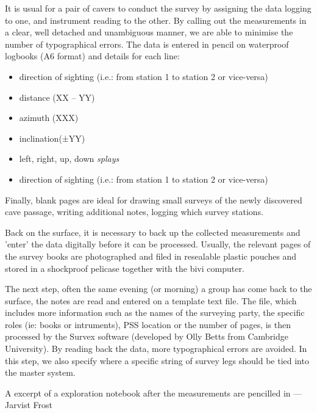 It is usual for a pair of cavers to conduct the survey by assigning the data logging to one, and instrument reading to the other. By calling out the measurements in a clear, well detached and unambiguous manner, we are able to minimise the number of typographical errors. The data is entered in pencil on waterproof logbooks (A6 format) and details for each line:

\begin{itemize}
\item direction of sighting (i.e.: from station 1 to station 2 or vice-versa)
\item distance (XX – YY)
\item azimuth (XXX)
\item inclination(±YY)
\item left, right, up, down \emph{splays}
\item direction of sighting (i.e.: from station 1 to station 2 or vice-versa)
\end{itemize}

Finally, blank pages are ideal for drawing small surveys of the newly discovered cave passage, writing additional notes, logging which survey stations.

Back on the surface, it is necessary to back up the collected measurements and 'enter' the data digitally before it can be processed. Usually, the relevant pages of the survey books are photographed and filed in resealable plastic pouches and stored in a shockproof pelicase together with the bivi computer. 

The next step, often the same evening (or morning) a group has come back to the surface, the notes are read and entered on a template text file. The file, which includes more information such as the names of the surveying party, the specific roles (ie: books or intruments), PSS location or the number of pages, is then processed by the Survex software (developed by Olly Betts from Cambridge University). By reading back the data, more typographical errors are avoided. In this step, we also specify where a specific string of survey legs should be tied into the master system. 

\begin{marginfigure}
\checkoddpage \ifoddpage \forcerectofloat \else \forceversofloat \fi
\centering
 \caption{A excerpt of a exploration notebook after the measurements are pencilled in ---Jarvist Frost}
 \label{notebook}
\end{marginfigure}

